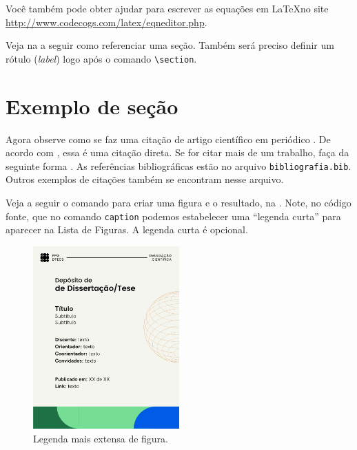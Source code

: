 Você também pode obter ajudar para escrever as equações em \LaTeX no site \url{http://www.codecogs.com/latex/eqneditor.php}.



Veja na  a seguir como referenciar uma seção. Também será preciso definir um rótulo (\textit{label}) logo após o comando \texttt{\textbackslash section}.

\section{Exemplo de seção}\label{sec:exemplo_secao} 
Agora observe como se faz uma citação de artigo científico em periódico \cite{Gradvohl2014c}. De acordo com \textcite{Gradvohl2016}, essa é uma citação direta. Se for citar mais de um trabalho, faça da seguinte forma \cite{Caldana2017,Gradvohl2015}. As referências bibliográficas estão no arquivo \texttt{bibliografia.bib}. Outros exemplos de citações também se encontram nesse arquivo.

Veja a seguir o comando para criar uma figura e o resultado, na . Note, no código fonte, que no comando \texttt{caption} podemos estabelecer uma \enquote{legenda curta} para aparecer na Lista de Figuras. A legenda curta é opcional.

\begin{figure}[!htb]
\centering
\includegraphics[width=0.5\textwidth]{Figuras/dtecs.jpg}
\caption[Legenda curta de figura]{Legenda mais extensa de figura.}
\label{fig:xwing}
\end{figure}


